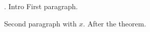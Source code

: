 
\document
{}. Intro\endhead
{} First paragraph.

Second paragraph with $x$.
\endproclaim
After the theorem.
\enddocument
